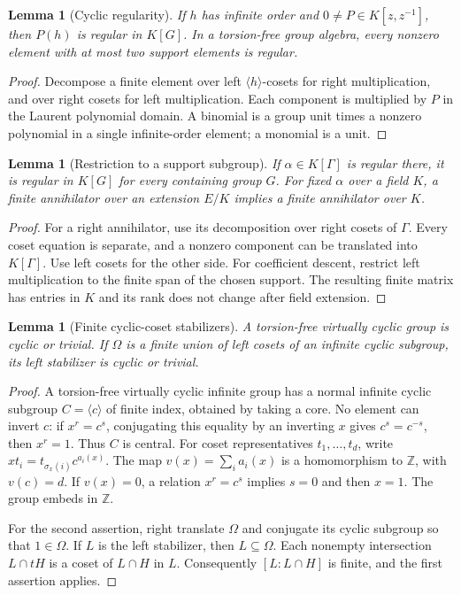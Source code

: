 \documentclass[11pt,a4paper,oneside]{report}
\newtheorem{lemma}[theorem]{Lemma}
\theoremstyle{definition}
\theoremstyle{remark}
\newcommand{\Z}{\mathbb Z}
\begin{document}
\begin{lemma}[Cyclic regularity]\label{P:lem:cyclic}
If $h$ has infinite order and $0\ne P\in K[z,z^{-1}]$, then $P(h)$
is regular in $K[G]$. In a torsion-free group algebra, every nonzero
element with at most two support elements is regular.
\end{lemma}
\begin{proof}
Decompose a finite element over left $\langle h\rangle$-cosets for
right multiplication, and over right cosets for left multiplication.
Each component is multiplied by $P$ in the Laurent polynomial domain.
A binomial is a group unit times a nonzero polynomial in a single
infinite-order element; a monomial is a unit.
\end{proof}

\begin{lemma}[Restriction to a support subgroup]\label{P:lem:subgroup}
If $\alpha\in K[\Gamma]$ is regular there, it is regular in $K[G]$
for every containing group $G$. For fixed $\alpha$ over a field $K$,
a finite annihilator over an extension $E/K$ implies a finite
annihilator over $K$.
\end{lemma}
\begin{proof}
For a right annihilator, use its decomposition over right cosets of
$\Gamma$. Every coset equation is separate, and a nonzero component
can be translated into $K[\Gamma]$. Use left cosets for the other
side. For coefficient descent, restrict left multiplication to the
finite span of the chosen support. The resulting finite matrix has
entries in $K$ and its rank does not change after field extension.
\end{proof}

\begin{lemma}[Finite cyclic-coset stabilizers]\label{P:lem:stabilizer}
A torsion-free virtually cyclic group is cyclic or trivial. If
$\Omega$ is a finite union of left cosets of an infinite cyclic
subgroup, its left stabilizer is cyclic or trivial.
\end{lemma}
\begin{proof}
A torsion-free virtually cyclic infinite group has a normal infinite
cyclic subgroup $C=\langle c\rangle$ of finite index, obtained by
taking a core. No element can invert $c$: if $x^r=c^s$, conjugating
this equality by an inverting $x$ gives $c^s=c^{-s}$, then $x^r=1$.
Thus $C$ is central. For coset representatives $t_1,\ldots,t_d$, write
$xt_i=t_{\sigma_x(i)}c^{a_i(x)}$. The map
$v(x)=\sum_i a_i(x)$ is a homomorphism to $\Z$, with $v(c)=d$.
If $v(x)=0$, a relation $x^r=c^s$ implies $s=0$ and then $x=1$.
The group embeds in $\Z$.

For the second assertion, right translate $\Omega$ and conjugate its
cyclic subgroup so that $1\in\Omega$. If $L$ is the left stabilizer,
then $L\subseteq\Omega$. Each nonempty intersection $L\cap tH$ is
a coset of $L\cap H$ in $L$. Consequently $[L:L\cap H]$ is finite,
and the first assertion applies.
\end{proof}
\end{document}
